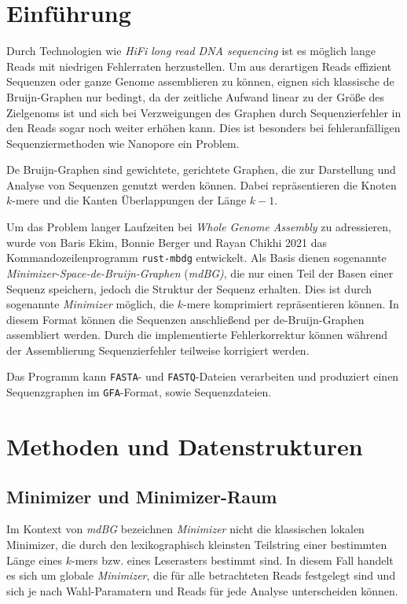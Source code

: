 \documentclass[a4paper, 11pt]{article}
\begin{document}

\section{Einführung} 
Durch Technologien wie \textit{HiFi long read DNA sequencing} ist es möglich lange Reads mit niedrigen Fehlerraten herzustellen. Um aus derartigen Reads effizient Sequenzen oder ganze Genome assemblieren zu können, eignen sich klassische de Bruijn-Graphen nur bedingt, da der zeitliche Aufwand linear zu der Größe des Zielgenoms ist und sich bei Verzweigungen des Graphen durch Sequenzierfehler in den Reads sogar noch weiter erhöhen kann. Dies ist besonders bei fehleranfälligen Sequenziermethoden wie Nanopore ein Problem. 

De Bruijn-Graphen sind gewichtete, gerichtete Graphen, die zur Darstellung und Analyse von Sequenzen genutzt werden können. Dabei repräsentieren die Knoten $k$-mere und die Kanten Überlappungen der Länge $k-1$. 

Um das Problem langer Laufzeiten bei \textit{Whole Genome Assembly} zu adressieren, wurde von Baris Ekim, Bonnie Berger und Rayan Chikhi 2021 das Kommandozeilenprogramm \texttt{rust-mbdg} entwickelt. Als Basis dienen sogenannte \textit{Minimizer-Space-de-Bruijn-Graphen} (\textit{mdBG)}, die nur einen Teil der Basen einer Sequenz speichern, jedoch die Struktur der Sequenz erhalten. Dies ist durch sogenannte \textit{Minimizer} möglich, die 
$k$-mere komprimiert repräsentieren können. In diesem Format können die Sequenzen anschließend per de-Bruijn-Graphen assembliert werden. Durch 
die implementierte Fehlerkorrektur können während der Assemblierung Sequenzierfehler teilweise korrigiert werden. 

Das Programm kann \texttt{FASTA}- und \texttt{FASTQ}-Dateien verarbeiten und produziert einen Sequenzgraphen im \texttt{GFA}-Format, sowie Sequenzdateien. 

\section{Methoden und Datenstrukturen}
\subsection{Minimizer und Minimizer-Raum}
Im Kontext von \textit{mdBG} bezeichnen \textit{Minimizer} nicht die klassischen lokalen Minimizer, die durch den lexikographisch kleinsten Teilstring einer bestimmten Länge eines $k$-mers bzw. eines Leserasters bestimmt sind. In diesem Fall handelt es sich um globale \textit{Minimizer}, die für alle betrachteten Reads festgelegt sind und sich je nach Wahl-Paramatern und Reads für jede Analyse unterscheiden können. 
\end{document}

